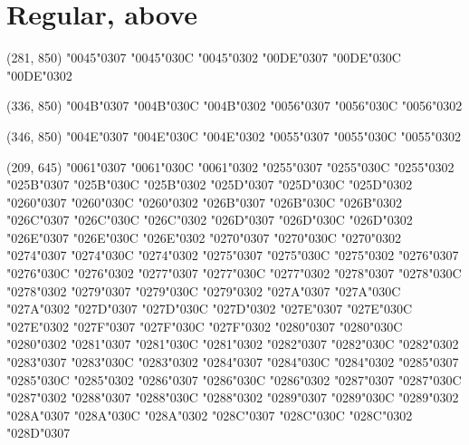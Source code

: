 \section*{Regular, above}

(281, 850) \char"0045\cgj\char"0307 \char"0045\cgj\char"030C \char"0045\cgj\char"0302 \char"00DE\cgj\char"0307 \char"00DE\cgj\char"030C \char"00DE\cgj\char"0302

(336, 850) \char"004B\cgj\char"0307 \char"004B\cgj\char"030C \char"004B\cgj\char"0302 \char"0056\cgj\char"0307 \char"0056\cgj\char"030C \char"0056\cgj\char"0302

(346, 850) \char"004E\cgj\char"0307 \char"004E\cgj\char"030C \char"004E\cgj\char"0302 \char"0055\cgj\char"0307 \char"0055\cgj\char"030C \char"0055\cgj\char"0302

(209, 645) \char"0061\cgj\char"0307 \char"0061\cgj\char"030C \char"0061\cgj\char"0302 \char"0255\cgj\char"0307 \char"0255\cgj\char"030C \char"0255\cgj\char"0302 \char"025B\cgj\char"0307 \char"025B\cgj\char"030C \char"025B\cgj\char"0302 \char"025D\cgj\char"0307 \char"025D\cgj\char"030C \char"025D\cgj\char"0302 \char"0260\cgj\char"0307 \char"0260\cgj\char"030C \char"0260\cgj\char"0302 \char"026B\cgj\char"0307 \char"026B\cgj\char"030C \char"026B\cgj\char"0302 \char"026C\cgj\char"0307 \char"026C\cgj\char"030C \char"026C\cgj\char"0302 \char"026D\cgj\char"0307 \char"026D\cgj\char"030C \char"026D\cgj\char"0302 \char"026E\cgj\char"0307 \char"026E\cgj\char"030C \char"026E\cgj\char"0302 \char"0270\cgj\char"0307 \char"0270\cgj\char"030C \char"0270\cgj\char"0302 \char"0274\cgj\char"0307 \char"0274\cgj\char"030C \char"0274\cgj\char"0302 \char"0275\cgj\char"0307 \char"0275\cgj\char"030C \char"0275\cgj\char"0302 \char"0276\cgj\char"0307 \char"0276\cgj\char"030C \char"0276\cgj\char"0302 \char"0277\cgj\char"0307 \char"0277\cgj\char"030C \char"0277\cgj\char"0302 \char"0278\cgj\char"0307 \char"0278\cgj\char"030C \char"0278\cgj\char"0302 \char"0279\cgj\char"0307 \char"0279\cgj\char"030C \char"0279\cgj\char"0302 \char"027A\cgj\char"0307 \char"027A\cgj\char"030C \char"027A\cgj\char"0302 \char"027D\cgj\char"0307 \char"027D\cgj\char"030C \char"027D\cgj\char"0302 \char"027E\cgj\char"0307 \char"027E\cgj\char"030C \char"027E\cgj\char"0302 \char"027F\cgj\char"0307 \char"027F\cgj\char"030C \char"027F\cgj\char"0302 \char"0280\cgj\char"0307 \char"0280\cgj\char"030C \char"0280\cgj\char"0302 \char"0281\cgj\char"0307 \char"0281\cgj\char"030C \char"0281\cgj\char"0302 \char"0282\cgj\char"0307 \char"0282\cgj\char"030C \char"0282\cgj\char"0302 \char"0283\cgj\char"0307 \char"0283\cgj\char"030C \char"0283\cgj\char"0302 \char"0284\cgj\char"0307 \char"0284\cgj\char"030C \char"0284\cgj\char"0302 \char"0285\cgj\char"0307 \char"0285\cgj\char"030C \char"0285\cgj\char"0302 \char"0286\cgj\char"0307 \char"0286\cgj\char"030C \char"0286\cgj\char"0302 \char"0287\cgj\char"0307 \char"0287\cgj\char"030C \char"0287\cgj\char"0302 \char"0288\cgj\char"0307 \char"0288\cgj\char"030C \char"0288\cgj\char"0302 \char"0289\cgj\char"0307 \char"0289\cgj\char"030C \char"0289\cgj\char"0302 \char"028A\cgj\char"0307 \char"028A\cgj\char"030C \char"028A\cgj\char"0302 \char"028C\cgj\char"0307 \char"028C\cgj\char"030C \char"028C\cgj\char"0302 \char"028D\cgj\char"0307 